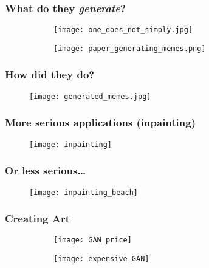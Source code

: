 \documentclass[aspectratio=149]{beamer}
\begin{document}
\begin{frame}
  \frametitle{What do they \emph{generate}?}
    \begin{figure}[ht]
      \centering
      \begin{subfigure}[c]{.45\textwidth}
        \texttt{[image: one\_does\_not\_simply.jpg]}
      \end{subfigure}
      \begin{subfigure}[c]{.52\textwidth}
        \texttt{[image: paper\_generating\_memes.png]}
      \end{subfigure}
    \end{figure}
\end{frame}



\begin{frame}
  \frametitle{How did they do?}
  \begin{figure}[ht]
    \centering
    \texttt{[image: generated\_memes.jpg]}
  \end{figure}
\end{frame}


\begin{frame}
  \frametitle{More serious applications (inpainting)}
  \begin{figure}[ht]
    \centering
    \texttt{[image: inpainting]}
  \end{figure}
\end{frame}


\begin{frame}
  \frametitle{Or less serious\ldots}

    \begin{figure}[ht]
      \centering
      \texttt{[image: inpainting\_beach]}
    \end{figure}
\end{frame}

\begin{frame}
  \frametitle{Creating Art}

    \begin{figure}[ht]
      \centering
      \begin{subfigure}[c]{.47\textwidth}
        \texttt{[image: GAN\_price]}
      \end{subfigure}
      \begin{subfigure}[c]{.47\textwidth}
        \texttt{[image: expensive\_GAN]}
      \end{subfigure}
    \end{figure}
\end{frame}
\end{document}
